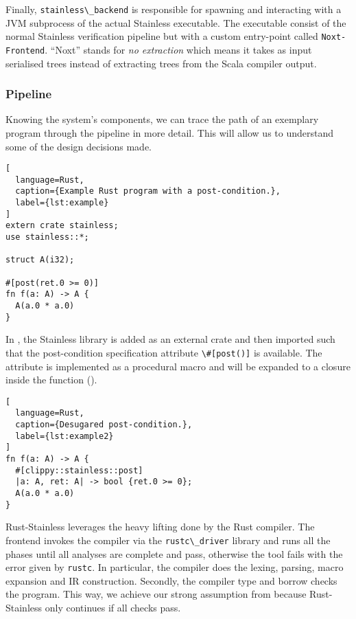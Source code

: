 Finally, \passthrough{\lstinline!stainless\_backend!} is responsible for
spawning and interacting with a JVM subprocess of the actual Stainless
executable. The executable consist of the normal Stainless verification
pipeline but with a custom entry-point called
\passthrough{\lstinline!Noxt-Frontend!}. ``Noxt'' stands for \emph{no
extraction} which means it takes as input serialised trees instead of
extracting trees from the Scala compiler output.

\begin{quote}
\end{quote}

\subsubsection{Pipeline}

Knowing the system's components, we can trace the path of an exemplary
program through the pipeline in more detail. This will allow us to
understand some of the design decisions made.

\begin{lstlisting}[
  language=Rust,
  caption={Example Rust program with a post-condition.},
  label={lst:example}
]
extern crate stainless;
use stainless::*;

struct A(i32);

#[post(ret.0 >= 0)]
fn f(a: A) -> A {
  A(a.0 * a.0)
}
\end{lstlisting}

In , the Stainless library is added as an external crate
and then imported such that the post-condition specification attribute
\passthrough{\lstinline!\#[post()]!} is available. The attribute is implemented
as a procedural macro  and will be expanded to a closure
inside the function ().

\begin{lstlisting}[
  language=Rust,
  caption={Desugared post-condition.},
  label={lst:example2}
]
fn f(a: A) -> A {
  #[clippy::stainless::post]
  |a: A, ret: A| -> bool {ret.0 >= 0};
  A(a.0 * a.0)
}
\end{lstlisting}

Rust-Stainless leverages the heavy lifting done by the Rust compiler. The
frontend invokes the compiler via the \passthrough{\lstinline!rustc\_driver!}
library and runs all the phases until all analyses are complete and pass,
otherwise the tool fails with the error given by
\passthrough{\lstinline!rustc!}. In particular, the compiler does the lexing,
parsing, macro expansion and IR construction. Secondly, the compiler type and
borrow checks the program. This way, we achieve our strong assumption from
 because Rust-Stainless only continues if all checks
pass.

